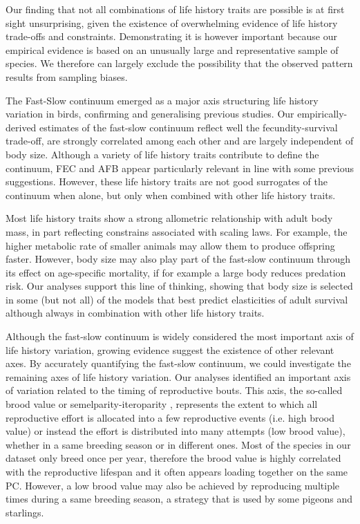 Our finding that not all combinations of life history traits are possible is at 
first sight unsurprising, given the existence of overwhelming evidence of life 
history trade-offs and constraints. Demonstrating it is however important 
because our empirical evidence is based on an unusually large and representative 
sample of species. We therefore can largely exclude the possibility that the 
observed pattern results from sampling biases.

The Fast-Slow continuum emerged as a major axis structuring life history 
variation in birds, confirming and generalising previous studies. Our 
empirically-derived estimates of the fast-slow continuum reflect well the 
fecundity-survival trade-off, are strongly correlated among each other and are 
largely independent of body size. Although a variety of life history traits 
contribute to define the continuum, FEC and AFB appear particularly relevant in
line with some previous suggestions. However, these life history traits are not
good surrogates of the continuum when alone, but only when combined with other
life history traits.

Most life history traits show a strong allometric relationship with adult body 
mass, in part reflecting constrains associated with scaling laws. For example, 
the higher metabolic rate of smaller animals may allow them to produce offspring 
faster. However, body size may also play part of the fast-slow continuum through 
its effect on age-specific mortality, if for example a large body reduces 
predation risk. Our analyses support this line of thinking, showing that body 
size is selected in some (but not all) of the models that best predict 
elasticities of adult survival although always in combination with other life 
history traits.

Although the fast-slow continuum is widely considered the most important axis of 
life history variation, growing evidence suggest the existence of other relevant 
axes. By accurately quantifying the fast-slow continuum, we could investigate 
the remaining axes of life history variation.
Our analyses identified an important axis of variation related to the timing of
reproductive bouts. This axis, the so-called brood value \citep{Bokony2009} or
semelparity-iteroparity \citep{Gaillard1989}, represents the extent to which
all reproductive effort is allocated into a few reproductive events (i.e. high
brood value) or instead the effort is distributed into many attempts (low brood
value), whether in a same breeding season or in different ones. Most of the
species in our dataset only breed once per year, therefore the brood value is
highly correlated with the reproductive lifespan and it often appears loading
together on the same PC. However, a low brood value may also be achieved by
reproducing multiple times during a same breeding season, a strategy that is
used by some pigeons and starlings.

